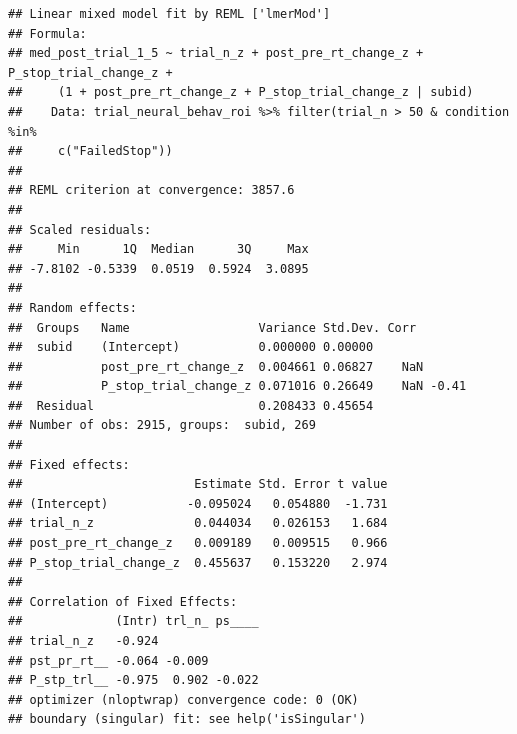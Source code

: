 \documentclass[
]{article}
\newenvironment{Shaded}{\begin{snugshade}}{\end{snugshade}}
\newcommand{\CommentTok}[1]{\textcolor[rgb]{0.56,0.35,0.01}{\textit{#1}}}
\newcommand{\DecValTok}[1]{\textcolor[rgb]{0.00,0.00,0.81}{#1}}
\newcommand{\KeywordTok}[1]{\textcolor[rgb]{0.13,0.29,0.53}{\textbf{#1}}}
\newcommand{\NormalTok}[1]{#1}
\newcommand{\OperatorTok}[1]{\textcolor[rgb]{0.81,0.36,0.00}{\textbf{#1}}}
\newcommand{\StringTok}[1]{\textcolor[rgb]{0.31,0.60,0.02}{#1}}
\begin{document}
\begin{verbatim}
## Linear mixed model fit by REML ['lmerMod']
## Formula: 
## med_post_trial_1_5 ~ trial_n_z + post_pre_rt_change_z + P_stop_trial_change_z +  
##     (1 + post_pre_rt_change_z + P_stop_trial_change_z | subid)
##    Data: trial_neural_behav_roi %>% filter(trial_n > 50 & condition %in%  
##     c("FailedStop"))
## 
## REML criterion at convergence: 3857.6
## 
## Scaled residuals: 
##     Min      1Q  Median      3Q     Max 
## -7.8102 -0.5339  0.0519  0.5924  3.0895 
## 
## Random effects:
##  Groups   Name                  Variance Std.Dev. Corr       
##  subid    (Intercept)           0.000000 0.00000             
##           post_pre_rt_change_z  0.004661 0.06827    NaN      
##           P_stop_trial_change_z 0.071016 0.26649    NaN -0.41
##  Residual                       0.208433 0.45654             
## Number of obs: 2915, groups:  subid, 269
## 
## Fixed effects:
##                        Estimate Std. Error t value
## (Intercept)           -0.095024   0.054880  -1.731
## trial_n_z              0.044034   0.026153   1.684
## post_pre_rt_change_z   0.009189   0.009515   0.966
## P_stop_trial_change_z  0.455637   0.153220   2.974
## 
## Correlation of Fixed Effects:
##             (Intr) trl_n_ ps____
## trial_n_z   -0.924              
## pst_pr_rt__ -0.064 -0.009       
## P_stp_trl__ -0.975  0.902 -0.022
## optimizer (nloptwrap) convergence code: 0 (OK)
## boundary (singular) fit: see help('isSingular')
\end{verbatim}

\begin{Shaded}
\end{Shaded}
\end{document}
